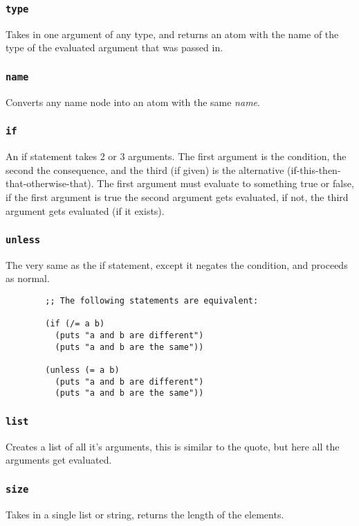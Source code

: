 \documentclass{article}
\newcommand{\code}[1]{\texttt{#1}}
\begin{document}
    \subsubsection{\code{type}}
      Takes in one argument of any type, and returns an atom with the name
      of the type of the evaluated argument that was passed in.

    \subsubsection{\code{name}}
      Converts any name node into an atom with the same \emph{name}.

    \subsubsection{\code{if}}
      An if statement takes 2 or 3 arguments. The first argument is the
      condition, the second the consequence, and the third (if given)
      is the alternative (if-this-then-that-otherwise-that).
      The first argument must evaluate to something true or false,
      if the first argument is true the second argument gets evaluated,
      if not, the third argument gets evaluated (if it exists).

    \subsubsection{\code{unless}}
      The very same as the if statement, except it negates the condition,
      and proceeds as normal.

      \begin{verbatim}
        ;; The following statements are equivalent:

        (if (/= a b)
          (puts "a and b are different")
          (puts "a and b are the same"))

        (unless (= a b)
          (puts "a and b are different")
          (puts "a and b are the same"))
      \end{verbatim}

    \subsubsection{\code{list}}
      Creates a list of all it's arguments, this is similar to the
      quote, but here all the arguments get evaluated.

    \subsubsection{\code{size}}
      Takes in a single list or string, returns the length of the
      elements.
\end{document}

